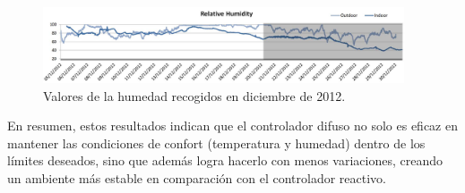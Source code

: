 \begin{figure}[H]
	\centering
	\includegraphics[width=0.95\textwidth]{imgs/graph-humidity-december.JPG}
	\caption{Valores de la humedad recogidos en diciembre de 2012.}
	\label{fig:graph-humidity-december}
\end{figure}

En resumen, estos resultados indican que el controlador difuso no solo es eficaz en mantener las condiciones de confort (temperatura y humedad) dentro de los límites deseados, sino que además logra hacerlo con menos variaciones, creando un ambiente más estable en comparación con el controlador reactivo.



